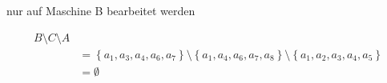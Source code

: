 nur auf Maschine B bearbeitet werden

\begin{align}
	 B \setminus C \setminus A \\
	& = \left\{a_1,a_3,a_4,a_6, a_7\right\} \setminus  \left\{ a_1, a_4, a_6, a_7, a_8 \right\} \setminus \left\{  a_1, a_2,a_3,a_4,a_5\right\}\\
	& = \emptyset
\end{align}